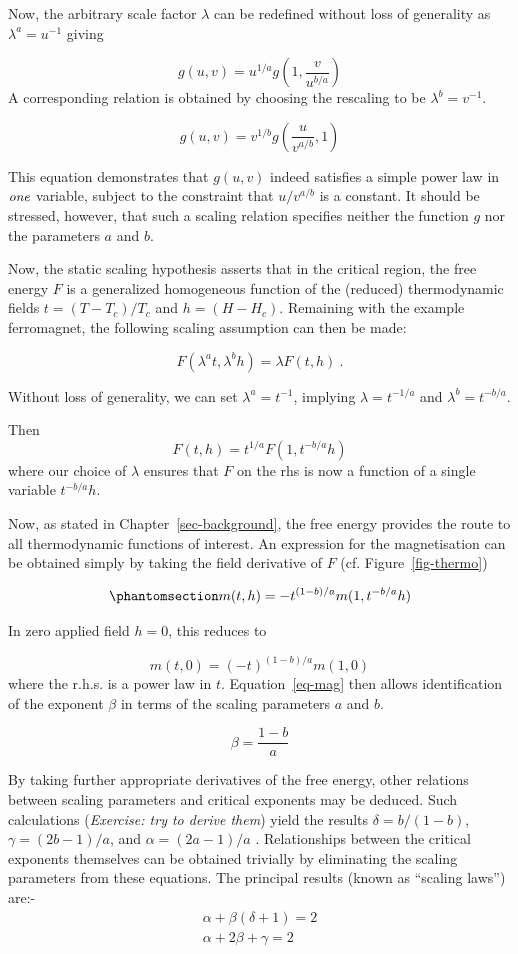 \documentclass[
  letterpaper,
  enabledeprecatedfontcommands]{report}
\begin{document}
Now, the arbitrary scale factor \(\lambda\) can be redefined without
loss of generality as \(\lambda^a=u^{-1}\) giving

\[g(u,v)=u^{1/a}g(1,\frac{v}{u^{b/a}})\] A corresponding relation is
obtained by choosing the rescaling to be \(\lambda^b=v^{-1}\).

\[\label{eq:sca2}
g(u,v)=v^{1/b}g(\frac{u}{v^{a/b}},1)\]

This equation demonstrates that \(g(u,v)\) indeed satisfies a simple
power law in \(\it{one}\) variable, subject to the constraint that
\(u/v^{a/b}\) is a constant. It should be stressed, however, that such a
scaling relation specifies neither the function \(g\) nor the parameters
\(a\) and \(b\).

Now, the static scaling hypothesis asserts that in the critical region,
the free energy \(F\) is a generalized homogeneous function of the
(reduced) thermodynamic fields \(t=(T-T_c)/T_c\) and \(h=(H-H_c)\).
Remaining with the example ferromagnet, the following scaling assumption
can then be made:

\[F(\lambda^a t,\lambda^b h)=\lambda F(t,h) \:.
\label{eq:scagibbs}\]

Without loss of generality, we can set \(\lambda^a=t^{-1}\), implying
\(\lambda=t^{-1/a}\) and \(\lambda^b=t^{-b/a}\).

Then \[F(t,h)=t^{1/a}F(1,t^{-b/a}h)\] where our choice of \(\lambda\)
ensures that \(F\) on the rhs is now a function of a single variable
\(t^{-b/a}h\).

Now, as stated in Chapter~\ref{sec-background}, the free energy provides
the route to all thermodynamic functions of interest. An expression for
the magnetisation can be obtained simply by taking the field derivative
of \(F\) (cf. Figure~\ref{fig-thermo})

\begin{equation}\phantomsection\label{eq-magscale}{m(t,h)=-t^{(1-b)/a}m(1,t^{-b/a}h)
}\end{equation}

In zero applied field \(h=0\), this reduces to

\[m(t,0)=(-t)^{(1-b)/a}m(1,0)\] where the r.h.s. is a power law in
\(t\). Equation~\ref{eq-mag} then allows identification of the exponent
\(\beta\) in terms of the scaling parameters \(a\) and \(b\).

\[\beta=\frac{1-b}{a}\]

By taking further appropriate derivatives of the free energy, other
relations between scaling parameters and critical exponents may be
deduced. Such calculations (\emph{Exercise: try to derive them}) yield
the results \(\delta =
b/(1-b)\),\(\gamma = (2b-1)/a\), and \(\alpha =(2a-1)/a\) .
Relationships between the critical exponents themselves can be obtained
trivially by eliminating the scaling parameters from these equations.
The principal results (known as ``scaling laws'') are:- \[
\begin{aligned}
\alpha+\beta(\delta+1)=2 \\
\alpha+2\beta+\gamma=2
\end{aligned} 
\]
\end{document}
